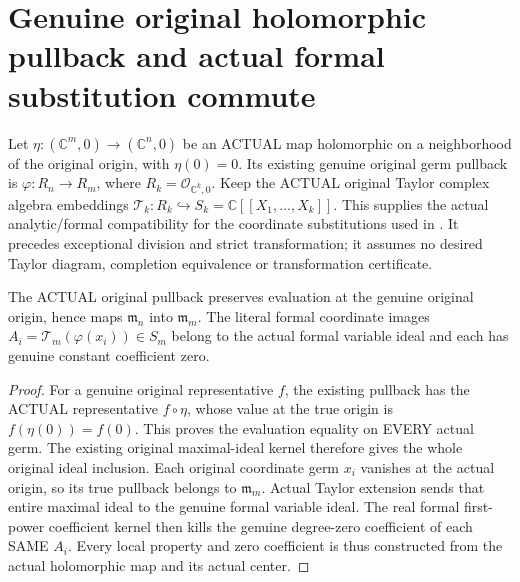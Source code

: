 \section{Genuine original holomorphic pullback and actual formal substitution commute}

Let $\eta:(\mathbb C^m,0)\to(\mathbb C^n,0)$ be an ACTUAL map
holomorphic on a neighborhood of the original origin, with $\eta(0)=0$.
Its existing genuine original germ pullback is
$\varphi:R_n\to R_m$, where $R_k=\mathcal O_{\mathbb C^k,0}$.
Keep the ACTUAL original Taylor complex algebra embeddings
$\mathcal T_k:R_k\hookrightarrow S_k=\mathbb C[[X_1,\ldots,X_k]]$.
This supplies the actual analytic/formal compatibility for the coordinate
substitutions used in \cite[\S7, pp.~267--274]{bierstone-milman97-invent-math}.
It precedes exceptional division and strict transformation; it assumes no
desired Taylor diagram, completion equivalence or transformation certificate.

\begin{lemma}
\label{hir:actual-original-pullback-local-formal-coordinate-images}
The ACTUAL original pullback preserves evaluation at the genuine original
origin, hence maps $\mathfrak m_n$ into $\mathfrak m_m$.
The literal formal coordinate images
$A_i=\mathcal T_m(\varphi(x_i))\in S_m$ belong to the actual formal
variable ideal and each has genuine constant coefficient zero.
\leanok
\end{lemma}
\begin{proof}
For a genuine original representative $f$, the existing pullback has
the ACTUAL representative $f\circ\eta$, whose value at the true
origin is $f(\eta(0))=f(0)$. This proves the evaluation equality on
EVERY actual germ. The existing original maximal-ideal kernel therefore
gives the whole original ideal inclusion. Each original coordinate germ
$x_i$ vanishes at the actual origin, so its true pullback belongs to
$\mathfrak m_m$. Actual Taylor extension sends that entire maximal
ideal to the genuine formal variable ideal. The real formal first-power
coefficient kernel then kills the genuine degree-zero coefficient of
each SAME $A_i$. Every local property and zero coefficient is thus
constructed from the actual holomorphic map and its actual center.
\end{proof}

